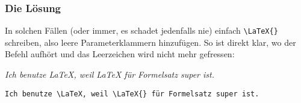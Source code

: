 			\subsubsection*{Die Lösung}
				In solchen Fällen (oder immer, es schadet jedenfalls nie) einfach \lstinline[language=thesis-latexbeispiel]|\LaTeX{}| schreiben, also leere Parameterklammern hinzufügen. So ist direkt klar, wo der Befehl aufhört und das Leerzeichen wird nicht mehr \glqq gefressen\grqq:
				\bigskip
				
				\emph{Ich benutze \LaTeX, weil \LaTeX{} für Formelsatz super ist.}
				\medskip
				
				\lstinline[language=thesis-latexbeispiel, showspaces=true]|Ich benutze \LaTeX, weil \LaTeX{} für Formelsatz super ist.|
